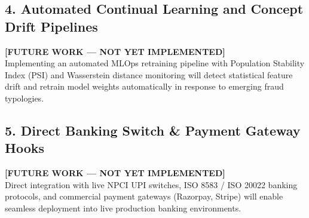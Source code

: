 \subsection{4. Automated Continual Learning and Concept Drift Pipelines}
\textbf{[FUTURE WORK --- NOT YET IMPLEMENTED]}\\
Implementing an automated MLOps retraining pipeline with Population Stability Index (PSI) and Wasserstein distance monitoring will detect statistical feature drift and retrain model weights automatically in response to emerging fraud typologies.

\subsection{5. Direct Banking Switch \& Payment Gateway Hooks}
\textbf{[FUTURE WORK --- NOT YET IMPLEMENTED]}\\
Direct integration with live NPCI UPI switches, ISO 8583 / ISO 20022 banking protocols, and commercial payment gateways (Razorpay, Stripe) will enable seamless deployment into live production banking environments.
